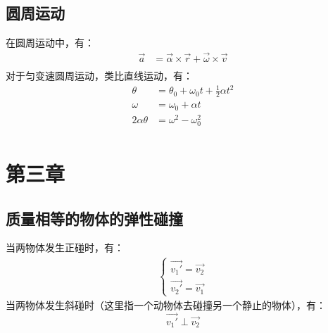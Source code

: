 \documentclass{ctexart}
\begin{document}
\subsection{圆周运动}
在圆周运动中，有：
\begin{align*}
    \vec{a} &= \vec{\alpha} \times \vec{r} + \vec{\omega} \times \vec{v} \\
\end{align*}
对于匀变速圆周运动，类比直线运动，有：
\begin{align*}
    \theta &= \theta_0 + \omega_0 t + \frac{1}{2} \alpha t^2 \\
    \omega &= \omega_0 + \alpha t \\
    2 \alpha \theta &= \omega^2 - \omega_0^2 \\
\end{align*}
\section{第三章}
\subsection{质量相等的物体的弹性碰撞}
当两物体发生正碰时，有：
\begin{align*}
    \begin{cases}
        \vec{v_1'} = \vec{v_2} \\
        \vec{v_2'} = \vec{v_1}
    \end{cases}
\end{align*}
当两物体发生斜碰时（这里指一个动物体去碰撞另一个静止的物体），有：
$$
    \vec{v_1'} \perp \vec{v_2}
$$
\end{document}
